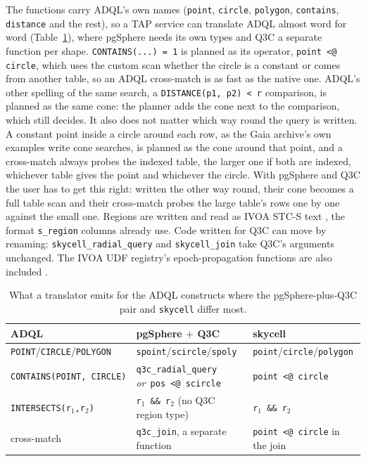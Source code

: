 The functions carry ADQL's own names (\texttt{point}, \texttt{circle},
\texttt{polygon}, \texttt{contains}, \texttt{distance} and the rest), so a TAP service
can translate ADQL almost word for word (Table~\ref{tab:ops}), where pgSphere needs its
own types and Q3C a separate function per shape. \texttt{CONTAINS(...) = 1} is planned
as its operator, \texttt{point <@ circle}, which uses the
custom scan whether the circle is a constant or comes from another table, so an ADQL
cross-match is as fast as the native one. ADQL's other spelling of the same search, a
\texttt{DISTANCE(p1, p2) < r} comparison, is planned as the same cone: the planner adds
the cone next to the comparison, which still decides. It also does not matter which way round the
query is written. A constant point inside a circle around each row, as the Gaia
archive's own examples write cone searches, is planned as the cone around that point,
and a cross-match always probes the indexed table, the larger one if both are indexed,
whichever table gives the point and whichever the circle. With pgSphere and Q3C the
user has to get this right: written the other way round, their cone becomes a full
table scan and their cross-match probes the large table's rows one by one against the
small one. Regions are written and read as IVOA STC-S
text \citep{stc}, the format \texttt{s\_region} columns already use. Code written for
Q3C can move by renaming: \texttt{skycell\_radial\_query} and \texttt{skycell\_join}
take Q3C's arguments unchanged. The IVOA UDF registry's epoch-propagation functions are also
included \citep{hipparcos}.

\begin{table}
  \caption{What a translator emits for the ADQL constructs where the pgSphere-plus-Q3C
    pair and \texttt{skycell} differ most.}
  \label{tab:ops}
  \centering
  \footnotesize
  \begin{tabular}{@{}p{} p{} p{}@{}}
    \hline\hline
    ADQL & pgSphere $+$ Q3C & skycell \\
    \hline
    \texttt{POINT}\allowbreak/\allowbreak\texttt{CIRCLE}\allowbreak/\allowbreak\texttt{POLYGON} &
      \texttt{spoint}\allowbreak/\allowbreak\texttt{scircle}\allowbreak/\allowbreak\texttt{spoly} &
      \texttt{point}\allowbreak/\allowbreak\texttt{circle}\allowbreak/\allowbreak\texttt{polygon} \\[2pt]
    \texttt{CONTAINS(}\allowbreak\texttt{POINT,}\allowbreak\ \texttt{CIRCLE)} &
      \texttt{q3c\_radial\_query} \emph{or}\allowbreak\ \texttt{pos <@ scircle} &
      \texttt{point <@ circle} \\[2pt]
    \texttt{INTERSECTS(}\allowbreak\texttt{r$_1$,}\allowbreak\texttt{r$_2$)} &
      \texttt{r$_1$ \&\& r$_2$} (no Q3C region type) &
      \texttt{r$_1$ \&\& r$_2$} \\[2pt]
    cross-match &
      \texttt{q3c\_join}, a separate function &
      \texttt{point <@ circle} in the join \\[2pt]
    \hline
  \end{tabular}
\end{table}

